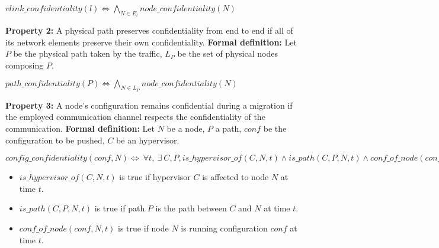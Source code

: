 \begin{myformula}
$vlink\_confidentiality(l) \Leftrightarrow \bigwedge\limits_{N\in E_l} node\_confidentiality(N) $
\end{myformula}

\textbf{Property 2:} A physical path preserves confidentiality from end to end if all of its network elements preserve their own confidentiality.
\newline \textbf{Formal definition:} Let $P$ be the physical path taken by the traffic, $L_P$ be the set of physical nodes composing $P$.

\begin{myformula}
$path\_confidentiality(P) \Leftrightarrow \bigwedge\limits_{N \in L_P}node\_confidentiality(N)$
\end{myformula}


\textbf{Property 3:} A node's configuration remains confidential during a migration if the employed communication channel respects the confidentiality of the communication.
\newline \textbf{Formal definition:} Let $N$ be a node, $P$ a path, $conf$ be the configuration to be pushed, $C$ be an hypervisor.

\begin{myformula}
$config\_confidentiality(conf,N) \Leftrightarrow~\forall t,~\exists~C,P, 
is\_hypervisor\_of(C,N,t) \wedge is\_path(C,P,N,t) \wedge  conf\_of\_node(conf,N,t) \Rightarrow
~path\_confidentiality(P) \wedge  node\_confidentiality(N)
$
\end{myformula}


\begin{itemize}
\item $is\_hypervisor\_of(C,N,t)$ is true if hypervisor $C$ is affected to node $N$ at time $t$. 
\item $is\_path(C,P,N,t)$ is true if path $P$ is the path between $C$ and $N$ at time $t$.
\item $conf\_of\_node(conf,N,t)$ is true if node $N$ is running configuration $conf$ at time $t$.
\end{itemize}


